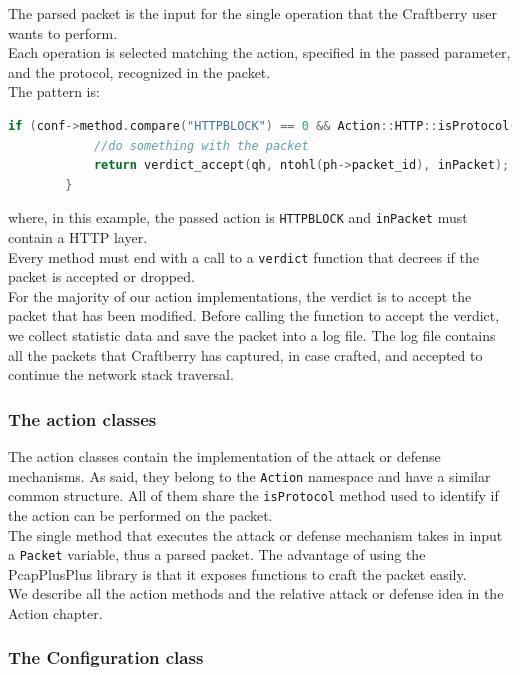 \documentclass[12pt]{article}
\begin{document}
	The parsed packet is the input for the single operation that the Craftberry user wants to perform.\\
	Each operation is selected matching the action, specified in the passed parameter, and the protocol, recognized in the packet.\\
	\bigbreak
	The pattern is: 
	\bigbreak

	\begin{lstlisting}[frame=single, language=C++]
		if (conf->method.compare("HTTPBLOCK") == 0 && Action::HTTP::isProtocol(inPacket)) {
			//do something with the packet
			return verdict_accept(qh, ntohl(ph->packet_id), inPacket);
		}
	\end{lstlisting}
	\bigbreak

	where, in this example, the passed action is \lstinline{HTTPBLOCK} and \lstinline{inPacket} must contain a HTTP layer.\\
	Every method must end with a call to a \lstinline{verdict} function that decrees if the packet is accepted or dropped.\\
	For the majority of our action implementations, the verdict is to accept the packet that has been modified. Before calling the function to accept the verdict, we collect statistic data and save the packet into a log file. The log file contains all the packets that Craftberry has captured, in case crafted, and accepted to continue the network stack traversal.

	\subsubsection{The action classes}

	The action classes contain the implementation of the attack or defense mechanisms. As said, they belong to the \lstinline{Action} namespace and have a similar common structure. All of them share the \lstinline{isProtocol} method used to identify if the action can be performed on the packet.\\
	The single method that executes the attack or defense mechanism takes in input a \lstinline{Packet} variable, thus a parsed packet. The advantage of using the PcapPlusPlus library is that it exposes functions to craft the packet easily.\\
	\bigbreak
	We describe all the action methods and the relative attack or defense idea in the Action chapter.

	\subsubsection{The Configuration class}
	
\end{document}
